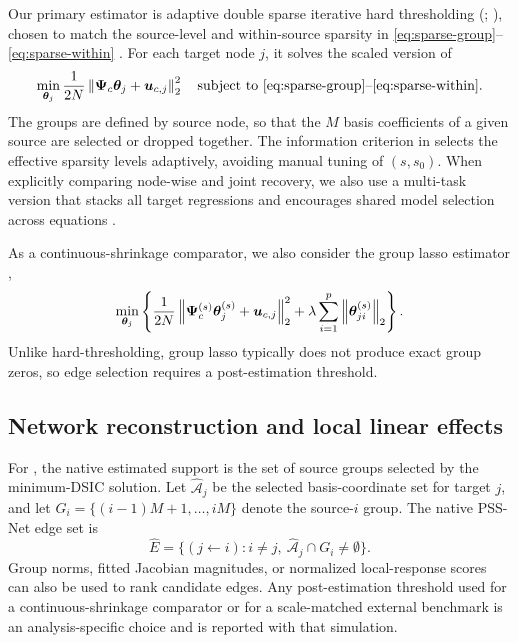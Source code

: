 Our primary estimator is adaptive double sparse iterative hard thresholding
(\adsiht{}; \citealp{zhang2023minimax}), chosen to match the source-level and
within-source sparsity in \eqref{eq:sparse-group}--\eqref{eq:sparse-within}
\citep{cai2022sparsegroup,zhang2023minimax}.  For each target node $j$, it
solves the scaled version of
\begin{equation}
  \min_{\bm{\theta}_j}
  \frac{1}{2N}
  \left\lVert\bm{\Psi}_{c}\bm{\theta}_j+\bm{u}_{c,j}\right\rVert_2^2
  \quad
  \text{subject to \eqref{eq:sparse-group}--\eqref{eq:sparse-within}}.
  \label{eq:adsiht-objective}
\end{equation}
The groups are defined by source node, so that the $M$ basis coefficients of a
given source are selected or dropped together.  The information criterion in
\adsiht{} selects the effective sparsity levels adaptively, avoiding manual
tuning of $(s,s_0)$.
When explicitly comparing node-wise and joint recovery, we also use a
multi-task version that stacks all target regressions and encourages shared
model selection across equations \citep{dong2026multitask}.

As a continuous-shrinkage comparator, we also consider the group lasso estimator
\citep{lounici2011group},
\begin{equation}
  \min_{\bm{\theta}_j}
  \left\{
  \frac{1}{2N}\left\lVert\bm{\Psi}_{c}^{(s)}\bm{\theta}_j^{(s)}+\bm{u}_{c,j}\right\rVert_2^2
  + \lambda \sum_{i=1}^{p}\left\lVert\bm{\theta}_{ji}^{(s)}\right\rVert_2
  \right\}.
  \label{eq:group-lasso}
\end{equation}
Unlike hard-thresholding, group lasso typically does not produce exact group
zeros, so edge selection requires a post-estimation threshold.

\subsection{Network reconstruction and local linear effects}
\label{sec:method:network}

For \adsiht{}, the native estimated support is the set of source groups selected
by the minimum-DSIC solution.  Let $\widehat{\mathcal A}_j$ be the selected
basis-coordinate set for target $j$, and let
$G_i=\{(i-1)M+1,\ldots,iM\}$ denote the source-$i$ group.  The native PSS-Net
edge set is
\begin{equation}
  \hat E
  =
  \{(j\leftarrow i): i\neq j,\ \widehat{\mathcal A}_j\cap G_i\neq\emptyset\}.
  \label{eq:edge-estimate}
\end{equation}
Group norms, fitted Jacobian magnitudes, or normalized local-response scores can
also be used to rank candidate edges.  Any post-estimation threshold used for a
continuous-shrinkage comparator or for a scale-matched external benchmark is an
analysis-specific choice and is reported with that simulation.

